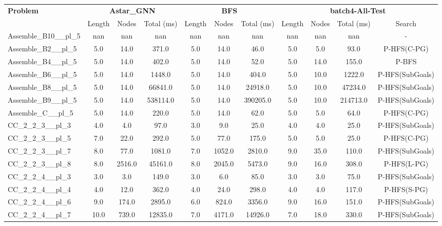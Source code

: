 \begin{table}[!ht]
\centering
\scriptsize
\begin{tabular}{l|ccc|ccc|cccc}
\multirow{2}{*}{\textbf{Problem}} & \multicolumn{3}{c|}{\textbf{Astar\_GNN}} & \multicolumn{3}{c|}{\textbf{BFS}} & \multicolumn{4}{c}{\textbf{batch4-All-Test}} \\
\cline{2-11}
& Length & Nodes & Total (ms) & Length & Nodes & Total (ms) & Length & Nodes & Total (ms) & Search \\
\hline
Assemble\_B10\_\_pl\_5 & nan & nan & nan & nan & nan & nan & nan & nan & nan & - \\
Assemble\_B2\_\_pl\_5 & 5.0 & 14.0 & 371.0 & 5.0 & 14.0 & 46.0 & 5.0 & 5.0 & 93.0 & P-HFS(C-PG) \\
Assemble\_B4\_\_pl\_5 & 5.0 & 14.0 & 402.0 & 5.0 & 14.0 & 52.0 & 5.0 & 14.0 & 155.0 & P-BFS \\
Assemble\_B6\_\_pl\_5 & 5.0 & 14.0 & 1448.0 & 5.0 & 14.0 & 404.0 & 5.0 & 10.0 & 1222.0 & P-HFS(SubGoals) \\
Assemble\_B8\_\_pl\_5 & 5.0 & 14.0 & 66841.0 & 5.0 & 14.0 & 24918.0 & 5.0 & 10.0 & 47234.0 & P-HFS(SubGoals) \\
Assemble\_B9\_\_pl\_5 & 5.0 & 14.0 & 538114.0 & 5.0 & 14.0 & 390205.0 & 5.0 & 10.0 & 214713.0 & P-HFS(SubGoals) \\
Assemble\_C\_\_pl\_5 & 5.0 & 14.0 & 220.0 & 5.0 & 14.0 & 62.0 & 5.0 & 5.0 & 64.0 & P-HFS(C-PG) \\
CC\_2\_2\_3\_\_pl\_3 & 4.0 & 4.0 & 97.0 & 3.0 & 9.0 & 25.0 & 4.0 & 4.0 & 25.0 & P-HFS(SubGoals) \\
CC\_2\_2\_3\_\_pl\_5 & 7.0 & 22.0 & 292.0 & 5.0 & 77.0 & 175.0 & 5.0 & 5.0 & 25.0 & P-HFS(C-PG) \\
CC\_2\_2\_3\_\_pl\_7 & 8.0 & 77.0 & 1081.0 & 7.0 & 1052.0 & 2810.0 & 9.0 & 35.0 & 110.0 & P-HFS(SubGoals) \\
CC\_2\_2\_3\_\_pl\_8 & 8.0 & 2516.0 & 45161.0 & 8.0 & 2045.0 & 5473.0 & 9.0 & 16.0 & 308.0 & P-HFS(L-PG) \\
CC\_2\_2\_4\_\_pl\_3 & 3.0 & 3.0 & 149.0 & 3.0 & 6.0 & 85.0 & 3.0 & 3.0 & 75.0 & P-HFS(SubGoals) \\
CC\_2\_2\_4\_\_pl\_4 & 4.0 & 12.0 & 362.0 & 4.0 & 24.0 & 298.0 & 4.0 & 4.0 & 117.0 & P-HFS(S-PG) \\
CC\_2\_2\_4\_\_pl\_6 & 9.0 & 174.0 & 2895.0 & 6.0 & 824.0 & 3356.0 & 9.0 & 16.0 & 151.0 & P-HFS(SubGoals) \\
CC\_2\_2\_4\_\_pl\_7 & 10.0 & 739.0 & 12835.0 & 7.0 & 4171.0 & 14926.0 & 7.0 & 18.0 & 330.0 & P-HFS(SubGoals) \\

\end{tabular}
\end{table}
